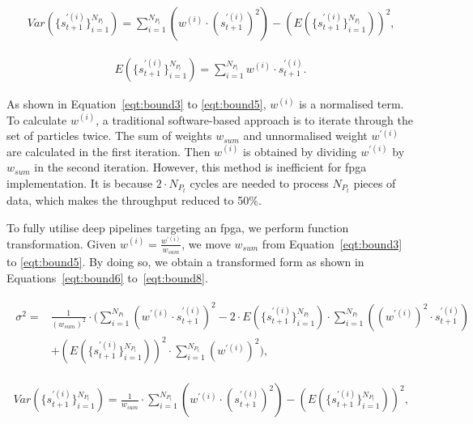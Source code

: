 \begin{equation}
\begin{aligned}
Var(\{s_{t+1}^{\prime(i)}\}^{N_{P_t}}_{i=1}) = \sum_{i=1}^{N_{P_t}} \left ( {w}^{(i)} \cdot (s_{t+1}^{\prime(i)})^2 \right ) - \left( E(\{s_{t+1}^{\prime(i)}\}^{N_{P_t}}_{i=1}) \right)^2 \mbox{,}
\end{aligned}
\label{eqt:bound4}
\end{equation}

\begin{equation}
\begin{aligned}
E(\{s_{t+1}^{\prime(i)}\}^{N_{P_t}}_{i=1}) = \sum_{i=1}^{N_{P_t}} {w}^{(i)} \cdot s_{t+1}^{\prime(i)} \mbox{.}
\end{aligned}
\label{eqt:bound5}
\end{equation}

As shown in Equation~\ref{eqt:bound3} to \ref{eqt:bound5}, ${w}^{(i)}$ is a normalised term. 
To calculate $w^{(i)}$, a traditional software-based approach is to iterate through the set of particles twice.
The sum of weights $w_{sum}$ and unnormalised weight $w^{\prime(i)}$ are calculated in the first iteration.
Then $w^{(i)}$ is obtained by dividing $w^{\prime(i)}$ by $w_{sum}$ in the second iteration.
However, this method is inefficient for \gls{fpga} implementation.
It is because $2 \cdot {N_{P_t}}$ cycles are needed to process ${N_{P_t}}$ pieces of data, which makes the throughput reduced to 50\%.

To fully utilise deep pipelines targeting an \gls{fpga}, we perform function transformation.
Given ${w}^{(i)} = \frac{w^{\prime(i)}}{w_{sum}}$, we move $w_{sum}$ from Equation~\ref{eqt:bound3} to \ref{eqt:bound5}.
By doing so, we obtain a transformed form as shown in Equations~\ref{eqt:bound6} to~\ref{eqt:bound8}.

\begin{eqnarray}
\begin{aligned}
\sigma^2 = & \frac{1}{(w_{sum})^2} \cdot ( \sum_{i=1}^{N_{P_t}}\left(w^{\prime(i)} \cdot s_{t+1}^{\prime(i)} \right)^2 - 2 \cdot E(\{s_{t+1}^{\prime(i)}\}^{N_{P_t}}_{i=1}) \cdot \sum_{i=1}^{N_{P_t}} \left ( (w^{\prime(i)})^2 \cdot s_{t+1}^{\prime(i)} \right )\\
& + \left(E(\{s_{t+1}^{\prime(i)}\}^{N_{P_t}}_{i=1})\right)^2 \cdot \sum_{i=1}^{N_{P_t}}(w^{\prime(i)})^2 ) \mbox{,}
\end{aligned}
\label{eqt:bound6}
\end{eqnarray}

\begin{equation}
\begin{aligned}
Var(\{s_{t+1}^{\prime(i)}\}^{N_{P_t}}_{i=1}) = \frac{1}{w_{sum}} \cdot \sum_{i=1}^{N_{P_t}} \left ( w^{\prime(i)} \cdot (s_{t+1}^{\prime(i)})^2 \right ) - \left( E(\{s_{t+1}^{\prime(i)}\}^{N_{P_t}}_{i=1}) \right)^2 \mbox{,}
\end{aligned}
\label{eqt:bound7}
\end{equation}

